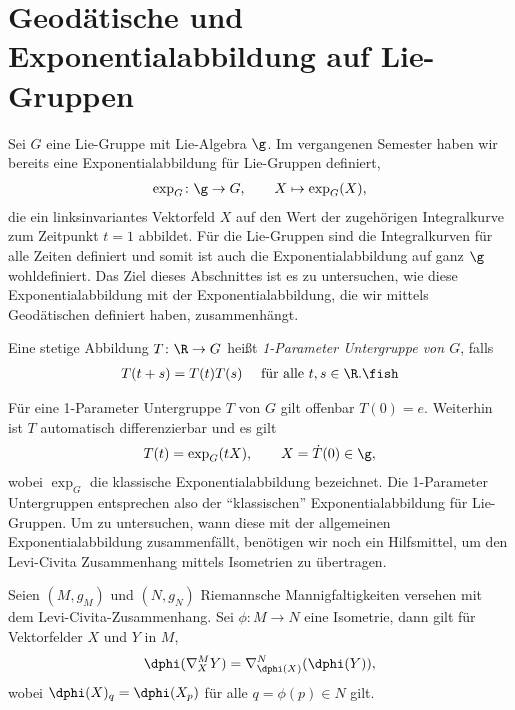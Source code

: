 \documentclass[%
	paper=a5,%
	fleqn,%
	DIV=18,%
	BCOR=0mm,
	fontsize=11pt,
	titlepage=false,%
	bibliography=totoc,
	DIV=18,%
	twoside=true,
	pdftitle=Riemannsche Geometrie,
	pdfauthor=Uwe Semmelmann,
	numbers=noendperiod]%
	{scrbook}
\begin{document}
\section{Geodätische und Exponentialabbildung auf Lie-Gruppen}

Sei $G$ eine Lie-Gruppe mit Lie-Algebra $\g$. Im vergangenen Semester haben wir bereits eine Exponentialabbildung für Lie-Gruppen definiert,
\begin{align*}
\exp_{G}\colon \g\to G,\qquad X\mapsto \exp_{G}(X),
\end{align*}
die ein linksinvariantes Vektorfeld $X$ auf den Wert der zugehörigen Integralkurve zum Zeitpunkt $t=1$ abbildet. Für die Lie-Gruppen sind die Integralkurven für alle Zeiten definiert und somit ist auch die Exponentialabbildung auf ganz $\g$ wohldefiniert.
Das Ziel dieses Abschnittes ist es zu untersuchen, wie diese Exponentialabbildung mit der Exponentialabbildung, die wir mittels Geodätischen definiert haben, zusammenhängt.

\begin{defn}
Eine stetige Abbildung $T\colon \R\to G$ heißt \emph{1-Parameter Untergruppe von $G$}, falls
\begin{align*}
T(t+s) = T(t)T(s)\quad\text{ für alle }t,s\in\R.\fish
\end{align*}
\end{defn}

Für eine 1-Parameter Untergruppe $T$ von $G$ gilt offenbar $T(0)=e$. Weiterhin ist $T$ automatisch differenzierbar und es gilt
\begin{align*}
T(t) = \exp_{G}(tX),\qquad X=\dot{T}(0)\in\g,
\end{align*}
wobei $\exp_{G}$ die klassische Exponentialabbildung bezeichnet. Die 1-Parameter Untergruppen entsprechen also der ``klassischen'' Exponentialabbildung für Lie-Gruppen. Um zu untersuchen, wann diese mit der allgemeinen Exponentialabbildung zusammenfällt, benötigen wir noch ein Hilfsmittel, um den Levi-Civita Zusammenhang mittels Isometrien zu übertragen.

\begin{lem}
Seien $(M,g_{M})$ und $(N,g_{N})$ Riemannsche Mannigfaltigkeiten versehen mit dem Levi-Civita-Zusammenhang.
Sei $\phi\colon M\to N$ eine Isometrie, dann gilt für Vektorfelder $X$ und $Y$ in $M$,
\begin{align*}
\dphi(\nabla_{X}^M Y) = \nabla_{\dphi(X)}^N(\dphi(Y)),
\end{align*}
wobei $\dphi(X)_{q} = \dphi(X_{p})$ für alle $q = \phi(p)\in N$ gilt.\fish
\end{lem}
\end{document}
